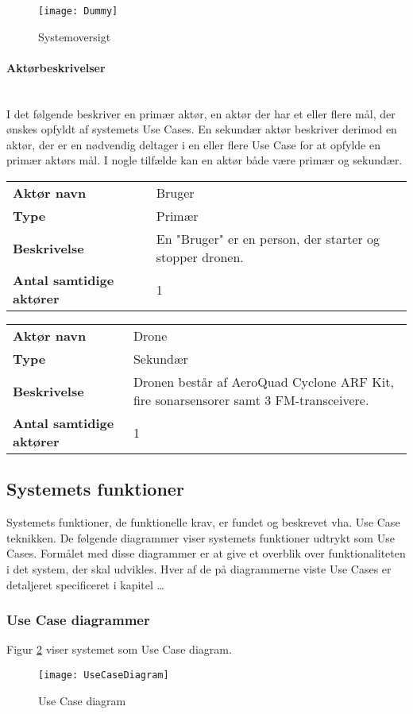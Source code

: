 \documentclass[Main]{subfiles}
\begin{document}
\begin{figure}[hbtp]
\centering
\texttt{[image: Dummy]}
\caption{Systemoversigt }
\label{Fig:Aktor-oversigt}
\end{figure}


\paragraph{Aktørbeskrivelser}\mbox{} \\%
I det følgende beskriver en primær aktør, en aktør der har et eller flere mål, der ønskes opfyldt af systemets Use Cases. 
En sekundær aktør beskriver derimod en aktør, der er en nødvendig deltager i en eller flere Use Case for at opfylde en primær aktørs mål. 
I nogle tilfælde kan en  aktør både være primær og sekundær.

\begin{longtable}{p{}|p{}}
\hline
\textbf{Aktør navn}  				& Bruger \\
\textbf{Type} 						& Primær \\
\textbf{Beskrivelse} 				& En "Bruger" er en person, der starter og stopper dronen. \\
\textbf{Antal samtidige aktører} 	& 1 \\
\hline
\end{longtable}

\begin{longtable}{p{}|p{}}
\hline
\textbf{Aktør navn}  				& Drone \\
\textbf{Type} 						& Sekundær \\
\textbf{Beskrivelse} 				& Dronen består af AeroQuad Cyclone ARF Kit, fire sonarsensorer samt 3 FM-transceivere. \\
\textbf{Antal samtidige aktører} 	& 1 \\
\hline
\end{longtable}


\subsection{Systemets funktioner}
Systemets funktioner, de funktionelle krav, er fundet og beskrevet vha. Use Case teknikken. 
De følgende diagrammer viser systemets funktioner udtrykt som Use Cases. 
Formålet med disse diagrammer er at give et overblik over funktionaliteten i det system, der skal udvikles. 
Hver af de på diagrammerne viste Use Cases er detaljeret specificeret i kapitel \dots %



\subsubsection{Use Case diagrammer}
Figur \ref{Fig:UC-Diagram} viser systemet som Use Case diagram.

\begin{figure}[hbtp]
\centering
\texttt{[image: UseCaseDiagram]}
\caption{Use Case diagram}
\label{Fig:UC-Diagram}
\end{figure}
\end{document}
